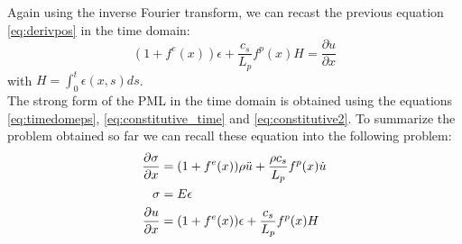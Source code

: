 Again using the inverse Fourier transform, we can recast the previous equation \ref{eq:derivpos} in the time domain:
\begin{equation}
    (1+f^e(x))\epsilon +\frac{c_s}{L_p}f^p(x) H = \frac{\partial u}{\partial x}
    \label{eq:timedomeps}
\end{equation}
with $H = \int_0^t \epsilon(x,s)ds$. \\
The strong form of the PML in the time domain is obtained using the equations \ref{eq:timedomeps}, \ref{eq:constitutive_time} and \ref{eq:constitutive2}. To summarize the problem obtained so far we can recall these equation into the following problem:
\begin{equation}
    \begin{aligned}
        \frac{\partial \sigma}{\partial x} &= (1+f^e(x))\rho \Ddot{u} + \frac{\rho c_s}{L_p} f^p(x) \Dot{u} \\
        \sigma &= E \epsilon \\
         \frac{\partial u}{\partial x} &= (1+f^e(x))\epsilon +\frac{c_s}{L_p}f^p(x) H 
    \end{aligned}
    \label{eq:governed_eq_PML}
\end{equation}

